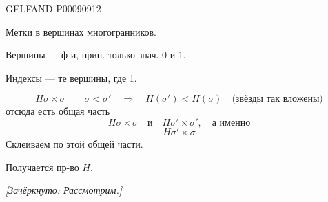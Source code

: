 \begin{GelfandAdjacentEvidence}{GELFAND-P000909}{12}


Метки в вершинах многогранников.

Вершины --- ф-и, прин. только знач. 0 и 1.

Индексы --- те вершины, где 1.

\[
H\sigma\times\sigma\qquad
\sigma<\sigma'\quad\Rightarrow\quad H(\sigma')<H(\sigma)
\quad\text{(звёзды так вложены)}
\]
отсюда есть общая часть
\[
H\sigma\times\sigma\quad\text{и}\quad H\sigma'\times\sigma',\quad\text{а именно}
\]
\[
\underline{H\sigma'\times\sigma}
\]
Склеиваем по этой общей части.

Получается пр-во $H$.

\textit{[Зачёркнуто: Рассмотрим.]}
\end{GelfandAdjacentEvidence}



